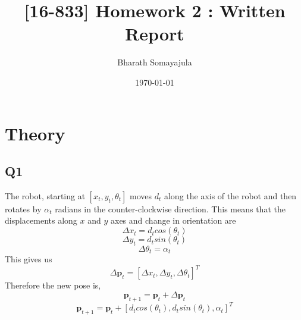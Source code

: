 \documentclass[12pt, a4paper]{article}
\title{[16-833] Homework 2 : Written Report}
\author{Bharath Somayajula}
\date{\today}
\begin{document}
\maketitle

\tableofcontents
\section{Theory}
\subsection{Q1}
The robot, starting at $\left[x_t, y_t, \theta_t\right]$ moves $d_t$ along the axis of the robot and then rotates by $\alpha_t$ radians in the counter-clockwise direction. This means that the displacements along $x$ and $y$ axes and change in orientation are
\[\Delta x_{t} = d_tcos(\theta_t)\]
\[\Delta y_{t} = d_tsin(\theta_t)\]
\[\Delta \theta_t = \alpha_t\]
This gives us
\[\Delta \mathbf{p}_t = [\Delta x_{t}, \Delta y_{t}, \Delta \theta_t]^T\]
Therefore the new pose is,
\[\mathbf{p}_{t+1} = \mathbf{p}_{t} + \Delta \mathbf{p}_t\] 
\[\mathbf{p}_{t+1} = \mathbf{p}_{t} + \left[d_tcos(\theta_t), d_tsin(\theta_t), \alpha_t\right]^T\] 
\end{document}
